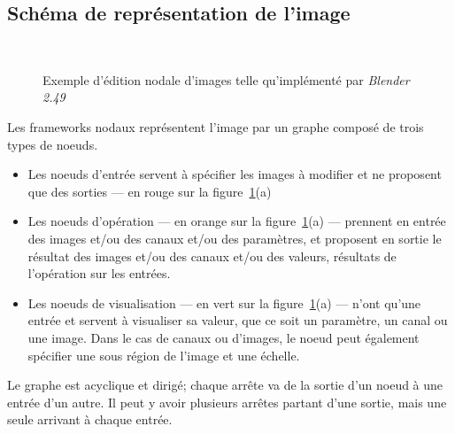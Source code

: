 		\subsection{Schéma de représentation de l'image}
			\begin{figure}[h]
				\centering
				\\
				\caption{Exemple d'édition nodale d'images telle qu'implémenté par \emph{Blender 2.49}}
				\label{fig:editnodal}
			\end{figure}
			Les frameworks nodaux représentent l'image par un graphe composé de trois types de noeuds.
			\begin{itemize}
				\item Les noeuds d'entrée servent à spécifier les images à modifier et ne proposent que des sorties --- en rouge sur la figure~\ref{fig:editnodal}(a)
				\item Les noeuds d'opération --- en orange sur la figure~\ref{fig:editnodal}(a) --- prennent en entrée des images et/ou des canaux et/ou des paramètres,
				et proposent en sortie le résultat des images et/ou des canaux et/ou des valeurs, résultats de
				l'opération sur les entrées.
				\item Les noeuds de visualisation --- en vert sur la figure~\ref{fig:editnodal}(a) --- n'ont qu'une entrée et servent à visualiser sa valeur, que ce soit un paramètre,
				un canal ou une image. Dans le cas de canaux ou d'images, le noeud peut également spécifier une sous région
				de l'image et une échelle.
			\end{itemize}
			Le graphe est acyclique et dirigé; chaque arrête va de la sortie d'un noeud à une entrée d'un autre. Il peut
			y avoir plusieurs arrêtes partant d'une sortie, mais une seule arrivant à chaque entrée. 
		
